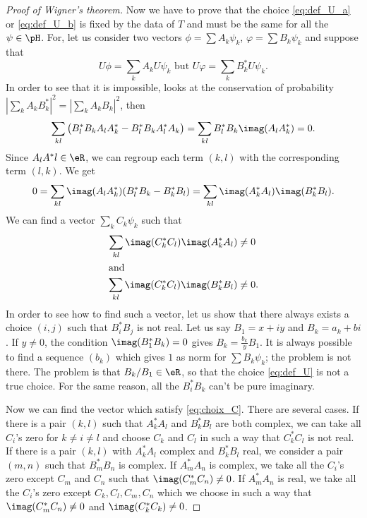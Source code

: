 \begin{proof}[Proof of Wigner's theorem]
Now we have to prove that the choice \eqref{eq:def_U_a} or \eqref{eq:def_U_b} is fixed by the data of $T$ and must be the same for all the $\psi\in\pH$. For, let us consider two vectors $\phi=\sum A_k\psi_k$, $\varphi=\sum B_k\psi_k$ and suppose that
\[
   U\phi=\sum_k A_k U\psi_k\text{ but } U\varphi=\sum_kB^*_k U\psi_k.
\]   
In order to see that it is impossible, looks at the conservation of probability $|\sum_k A_kB^*_k|^2=|\sum_k A_kB_k|^2$, then
\begin{equation}
\sum_{kl}\big(   B^*_lB_kA_lA^*_k-B^*_lB_kA^*_lA_k    \big)=\sum_{kl}B^*_lB_k\imag(A_lA^*_k)=0.
\end{equation}
Since $A_lA^*l\in\eR$, we can regroup each term $(k,l)$ with the corresponding term $(l,k)$. We get
\begin{equation}\label{eq:imim_zero}
\begin{split}
  0=\sum_{kl}\imag(A_lA^*_k)(B^*_lB_k-B^*_kB_l)
   =\sum_{kl}\imag(A^*_kA_l)\imag(B^*_kB_l).
\end{split}   
\end{equation}
We can find a vector $\sum_kC_k\psi_k$ such that 
\begin{subequations}\label{eq:choix_C}
\begin{align}
 \sum_{kl}\imag(C^*_kC_l)\imag(A^*_kA_l)&\neq 0  \label{eq:choix_C_a}\\
\intertext{and}
 \sum_{kl}\imag(C^*_kC_l)\imag(B^*_kB_l)&\neq 0.
\end{align}
\end{subequations}
In order to see how to find such a vector, let us show that there always exists a choice $(i,j)$ such that $B^*_iB_j$ is not real. Let us say $B_1=x+iy$ and $B_k=a_k+bi$. If $y\neq 0$, the condition $\imag(B_1^*B_k)=0$ gives $B_k=\frac{b_k}{y}B_1$. It is always possible to find a sequence $(b_k)$ which gives $1$ as norm for $\sum B_k\psi_k$; the problem is not there. The problem is that $B_k/B_1\in\eR$, so that the choice \eqref{eq:def_U}  is not a true choice. For the same reason, all the $B^*_iB_k$ can't be pure imaginary.

Now we can find the vector which satisfy \eqref{eq:choix_C}. There are several cases. If there is a pair $(k,l)$ such that $A^*_kA_l$ and $B^*_kB_l$ are both complex, we can take all $C_i$'s zero for $k\neq i\neq l$ and choose $C_k$ and $C_l$ in such a way that $C^*_kC_l$ is not real. If there is a pair $(k,l)$ with $A^*_kA_l$ complex and $B^*_kB_l$ real, we consider a pair $(m,n)$ such that $B^*_mB_n$ is complex. If $A^*_mA_n$ is complex, we take all the $C_i$'s zero except $C_m$ and $C_n$ such that $\imag(C^*_mC_n)\neq 0$. If $A^*_mA_n$ is real, we take all the $C_i$'s zero except $C_k,C_l,C_m,C_n$ which we choose in such a way that $\imag(C^*_mC_n)\neq 0$ and $\imag(C^*_kC_k)\neq 0$.


\end{proof}
